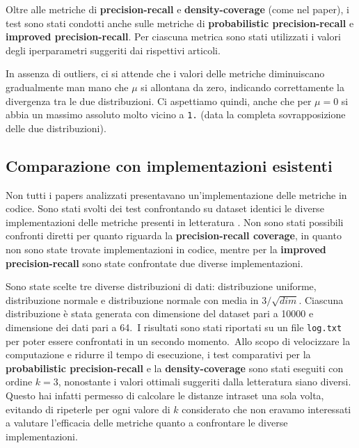 Oltre alle metriche di \textbf{precision-recall} e \textbf{density-coverage} (come nel paper), i test sono stati condotti anche sulle metriche di \textbf{probabilistic precision-recall} e \textbf{improved precision-recall}. Per ciascuna metrica sono stati utilizzati i valori degli iperparametri suggeriti dai rispettivi articoli.

In assenza di outliers, ci si attende che i valori delle metriche diminuiscano gradualmente man mano che \(\mu\) si allontana da zero, indicando correttamente la divergenza tra le due distribuzioni. Ci aspettiamo quindi, anche che per \(\mu = 0\) si abbia un massimo assoluto molto vicino a \texttt{1.} (data la completa sovrapposizione delle due distribuzioni).\

\subsection{Comparazione con implementazioni esistenti}
\label{subsec:comparazione}

Non tutti i papers analizzati presentavano un'implementazione delle metriche in codice. Sono stati svolti dei test confrontando su dataset identici le diverse implementazioni delle metriche presenti in letteratura \cite{2ImprovedPrecisionRecall} \cite{3ReliableFidelityDiversityMetrics} \cite{4ProbabilisticPrecisionRecall}.
Non sono stati possibili confronti diretti per quanto riguarda la \textbf{precision-recall coverage}, in quanto non sono state trovate implementazioni in codice, mentre per la \textbf{improved precision-recall} sono state confrontate due diverse implementazioni.

Sono state scelte tre diverse distribuzioni di dati: distribuzione uniforme, distribuzione normale e distribuzione normale con media in \(3/\sqrt{dim}\). Ciascuna distribuzione è stata generata con dimensione del dataset pari a 10000 e dimensione dei dati pari a 64.\
I risultati sono stati riportati su un file \texttt{log.txt} per poter essere confrontati in un secondo momento.\
Allo scopo di velocizzare la computazione e ridurre il tempo di esecuzione, i test comparativi per la \textbf{probabilistic precision-recall} e la \textbf{density-coverage} sono stati eseguiti con ordine \( k = 3 \), nonostante i valori ottimali suggeriti dalla letteratura siano diversi. Questo hai infatti permesso di calcolare le distanze intraset una sola volta, evitando di ripeterle per ogni valore di \( k \) considerato che non eravamo interessati a valutare l'efficacia delle metriche quanto a confrontare le diverse implementazioni.

